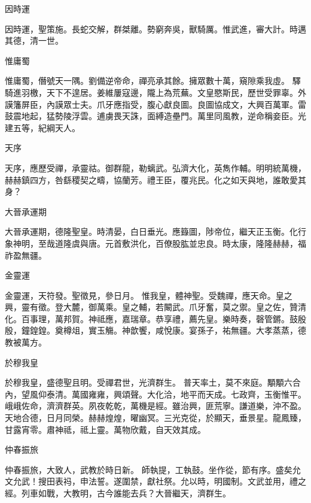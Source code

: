 \begin{pinyinscope}
 因時運



 因時運，聖策施。長蛇交解，群桀離。勢窮奔吳，獸騎厲。惟武進，審大計。時邁其德，清一世。



 惟庸蜀



 惟庸蜀，僭號天一隅。劉備逆帝命，禪亮承其餘。擁眾數十萬，窺隙乘我虛。
 驛騎進羽檄，天下不遑居。姜維屢寇邊，隴上為荒蕪。文皇愍斯民，歷世受罪辜。外謨籓屏臣，內謨眾士夫。爪牙應指受，腹心獻良圖。良圖協成文，大興百萬軍。雷鼓震地起，猛勢陵浮雲。逋虜畏天誅，面縛造壘門。萬里同風教，逆命稱妾臣。光建五等，紀綱天人。



 天序



 天序，應歷受禪，承靈祜。御群龍，勒螭武。弘濟大化，英雋作輔。明明統萬機，
 赫赫鎮四方，咎繇稷契之疇，協蘭芳。禮王臣，覆兆民。化之如天與地，誰敢愛其身？



 大晉承運期



 大晉承運期，德隆聖皇。時清晏，白日垂光。應籙圖，陟帝位，繼天正玉衡。化行象神明，至哉道隆虞與唐。元首敷洪化，百僚股肱並忠良。時太康，隆隆赫赫，福祚盈無疆。



 金靈運



 金靈運，天符發。聖徵見，參日月。
 惟我皇，體神聖。受魏禪，應天命。皇之興，靈有徵。登大麓，御萬乘。皇之輔，若闞武。爪牙奮，莫之禦。皇之佐，贊清化。百事理，萬邦賀。神祗應，嘉瑞章。恭享禮，薦先皇。樂時奏，磬管鏘。鼓殷殷，鐘鍠鍠。奠樽俎，實玉觴。神歆饗，咸悅康。宴孫子，祐無疆。大孝蒸蒸，德教被萬方。



 於穆我皇



 於穆我皇，盛德聖且明。受禪君世，光濟群生。
 普天率土，莫不來庭。顒顒六合內，望風仰泰清。萬國雍雍，興頌聲。大化洽，地平而天成。七政齊，玉衡惟平。峨峨佐命，濟濟群英。夙夜乾乾，萬機是經。雖治興，匪荒寧。謙道樂，沖不盈。天地合德，日月同榮。赫赫煌煌，曜幽冥。三光克從，於顯天，垂景星。龍鳳臻，甘露宵零。肅神祗，祗上靈。萬物欣戴，自天效其成。



 仲春振旅



 仲春振旅，大致人，武教於時日新。
 師執提，工執鼓。坐作從，節有序。盛矣允文允武！搜田表祃，申法誓。遂圍禁，獻社祭。允以時，明國制。文武並用，禮之經。列車如戰，大教明，古今誰能去兵？大晉繼天，濟群生。




\end{pinyinscope}
